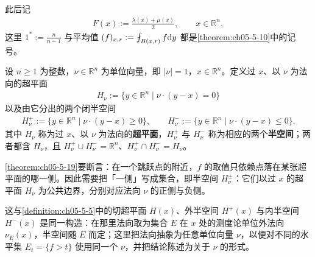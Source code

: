 \documentclass[../../main.tex]{subfiles}%
\begin{document}
\begin{remark}\label{remark:ch05-thm-5-18-平均}
此后记
\begin{align*}
F(x):=\frac{\lambda(x)+\mu(x)}{2},\qquad x\in\mathbb{R}^n ,
\end{align*}
这里 $1^{*}:=\frac{n}{n-1}$ 与平均值 $(f)_{x,r}:=\fint_{B(x,r)}f\diff y$ 都是\cref{theorem:ch05-5-10}中的记号。%
\end{remark}

\begin{definition}[超平面与半空间]\label{definition:ch05-5-10}
设 $n\geqslant1$ 为整数，$\nu\in\mathbb{R}^n$ 为单位向量，即 $\lvert\nu\rvert=1$，$x\in\mathbb{R}^n$。定义过 $x$、以 $\nu$ 为法向的超平面
\begin{align*}
H_\nu:=\{y\in\mathbb{R}^n\mid\nu\cdot(y-x)=0\}
\end{align*}
以及由它分出的两个闭半空间
\begin{align*}
H_\nu^+:=\{y\in\mathbb{R}^n\mid\nu\cdot(y-x)\geqslant0\},\qquad
H_\nu^-:=\{y\in\mathbb{R}^n\mid\nu\cdot(y-x)\leqslant0\}.
\end{align*}
其中 $H_\nu$ 称为过 $x$、以 $\nu$ 为法向的\textbf{超平面}，$H_\nu^+$ 与 $H_\nu^-$ 称为相应的两个\textbf{半空间}；两者都含 $H_\nu$，且 $H_\nu^+\cup H_\nu^-=\mathbb{R}^n$、$H_\nu^+\cap H_\nu^-=H_\nu$。
\end{definition}

\begin{remark}\label{remark:ch05-def-5-10-动机}
\cref{theorem:ch05-5-19}要断言：在一个跳跃点的附近，$f$ 的取值只依赖点落在某张超平面的哪一侧。因此需要把「一侧」写成集合，即半空间 $H_\nu^\pm$：它们以过 $x$ 的超平面 $H_\nu$ 为公共边界，分别对应法向 $\nu$ 的正侧与负侧。 %

这与\cref{definition:ch05-5-5}中的切超平面 $H(x)$、外半空间 $H^+(x)$ 与内半空间 $H^-(x)$ 是同一构造：在那里法向取为集合 $E$ 在 $x$ 处的测度论单位外法向 $\nu_E(x)$，半空间随 $E$ 而定；这里把法向抽象为任意单位向量 $\nu$，以便对不同的水平集 $E_t=\{f>t\}$ 使用同一个 $\nu$，并把结论陈述为关于 $\nu$ 的形式。%
\end{remark}
\end{document}
